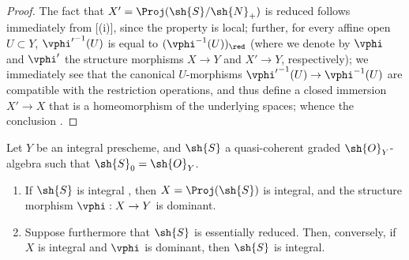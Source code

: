 \begin{proof}
The fact that $X'=\Proj(\sh{S}/\sh{N}_+)$ is reduced follows immediately from [(i)], since the property is local;
further, for every affine open $U\subset Y$, ${\vphi'}^{-1}(U)$ is equal to $(\vphi^{-1}(U))_\red$ (where we denote by $\vphi$ and $\vphi'$ the structure morphisms $X\to Y$ and $X'\to Y$, respectively);
we immediately see that the canonical $U$-morphisms ${\vphi'}^{-1}(U)\to\vphi^{-1}(U)$ are compatible with the restriction operations, and thus define a closed immersion $X'\to X$ that is a homeomorphism of the underlying spaces;
whence the conclusion .
\end{proof}

\begin{proposition}[3.1.14]
\label{II.3.1.14}
Let $Y$ be an integral prescheme, and $\sh{S}$ a quasi-coherent graded $\sh{O}_Y$-algebra such that $\sh{S}_0=\sh{O}_Y$.
\begin{enumerate}
  \item[(i)] If $\sh{S}$ is integral , then $X=\Proj(\sh{S})$ is integral, and the structure morphism $\vphi: X\to Y$ is dominant.
  \item[(ii)] Suppose furthermore that $\sh{S}$ is essentially reduced.
    Then, conversely, if $X$ is integral and $\vphi$ is dominant, then $\sh{S}$ is integral.
\end{enumerate}
\end{proposition}

